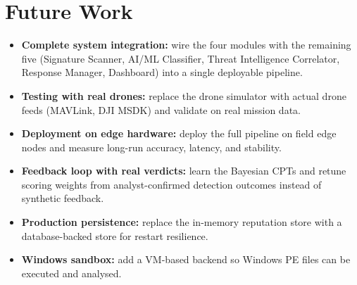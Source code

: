 \documentclass[12pt, a4paper]{report}
\begin{document}
\section{Future Work}

\begin{itemize}
    \item \textbf{Complete system integration:} wire the four modules
          with the remaining five (Signature Scanner, AI/ML Classifier,
          Threat Intelligence Correlator, Response Manager, Dashboard)
          into a single deployable pipeline.
    \item \textbf{Testing with real drones:} replace the drone
          simulator with actual drone feeds (MAVLink, DJI MSDK) and
          validate on real mission data.
    \item \textbf{Deployment on edge hardware:} deploy the full
          pipeline on field edge nodes and measure long-run accuracy,
          latency, and stability.
    \item \textbf{Feedback loop with real verdicts:} learn the
          Bayesian CPTs and retune scoring weights from analyst-confirmed
          detection outcomes instead of synthetic feedback.
    \item \textbf{Production persistence:} replace the in-memory
          reputation store with a database-backed store for restart
          resilience.
    \item \textbf{Windows sandbox:} add a VM-based backend so
          Windows PE files can be executed and analysed.
\end{itemize}

\cleardoublepage




\nocite{*}


\end{document}
